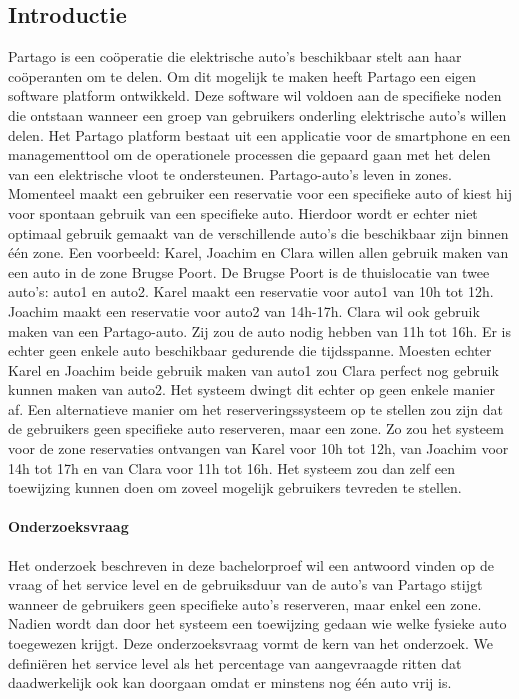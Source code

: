 \documentclass[a0,portrait]{a0poster}
\begin{document}
\begin{multicols}{2}
\section*{Introductie}
\color{black}
\color{black}
Partago is een coöperatie die elektrische auto's beschikbaar stelt aan haar coöperanten om te delen. Om dit mogelijk te maken heeft Partago een eigen software platform ontwikkeld. Deze software wil voldoen aan de specifieke noden die ontstaan wanneer een groep van gebruikers onderling elektrische auto's willen delen. Het Partago platform bestaat uit een applicatie voor de smartphone en een managementtool om de operationele processen die gepaard gaan met het delen van een elektrische vloot te ondersteunen.
Partago-auto's leven in zones. Momenteel maakt een gebruiker een reservatie voor een specifieke auto of kiest hij voor spontaan gebruik van een specifieke auto. Hierdoor wordt er echter niet optimaal gebruik gemaakt van de verschillende auto's die beschikbaar zijn binnen één zone. Een voorbeeld: Karel, Joachim en Clara willen allen gebruik maken van een auto in de zone Brugse Poort. De Brugse Poort is de thuislocatie van twee auto's: auto1 en auto2. Karel maakt een reservatie voor auto1 van 10h tot 12h. Joachim maakt een reservatie voor auto2 van 14h-17h. Clara wil ook gebruik maken van een Partago-auto. Zij zou de auto nodig hebben van 11h tot 16h. Er is echter geen enkele auto beschikbaar gedurende die tijdsspanne. Moesten echter Karel en Joachim beide gebruik maken van auto1 zou Clara perfect nog gebruik kunnen maken van auto2. Het systeem dwingt dit echter op geen enkele manier af. Een alternatieve manier om het reserveringssysteem op te stellen zou zijn dat de gebruikers geen specifieke auto reserveren, maar een zone. Zo zou het systeem voor de zone reservaties ontvangen van Karel voor 10h tot 12h, van Joachim voor 14h tot 17h en van Clara voor 11h tot 16h. Het systeem zou dan zelf een toewijzing kunnen doen om zoveel mogelijk gebruikers tevreden te stellen.
\paragraph{Onderzoeksvraag}
Het onderzoek beschreven in deze bachelorproef wil een antwoord vinden op de vraag of het service level en de gebruiksduur van de auto's van Partago stijgt wanneer de gebruikers geen specifieke auto's reserveren, maar enkel een zone. Nadien wordt dan door het systeem een toewijzing gedaan wie welke fysieke auto toegewezen krijgt. Deze onderzoeksvraag vormt de kern van het onderzoek. We definiëren het service level als het percentage van aangevraagde ritten dat daadwerkelijk ook kan doorgaan omdat er minstens nog één auto vrij is.


\end{multicols}
\end{document}
